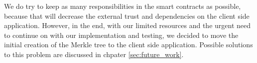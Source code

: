 We do try to keep as many responsibilities in the smart contracts as possible, because that will decrease the external trust and dependencies on the client side application. However, in the end, with our limited resources and the urgent need to continue on with our implementation and testing, we decided to move the initial creation of the Merkle tree to the client side application. Possible solutions to this problem are discussed in chpater \ref{sec:future_work}.

\newpage
